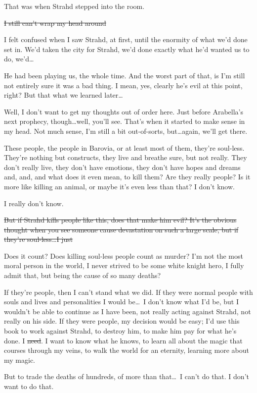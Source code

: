 That was when Strahd stepped into the room.

\st{I still can't wrap my head around}

I felt confused when I saw Strahd, at first, until the enormity of what we'd done set in. We'd taken the city for Strahd, we'd done exactly what he'd wanted us to do, we'd\dots

He had been playing us, the whole time. And the worst part of that, is I'm still not entirely sure it was a bad thing. I mean, yes, clearly he's evil at this point, right? But that what we learned later\dots

Well, I don't want to get my thoughts out of order here. Just before Arabella's next prophecy, though\dots well, you'll see. That's when it started to make sense in my head. Not much sense, I'm still a bit out-of-sorts, but\dots again, we'll get there.

These people, the people in Barovia, or at least most of them, they're soul-less. They're nothing but constructs, they live and breathe sure, but not really. They don't really live, they don't have emotions, they don't have hopes and dreams and, and, and what does it even mean, to kill them? Are they really people? Is it more like killing an animal, or maybe it's even less than that? I don't know.

I really don't know.

\st{But if Strahd kills people like this, does that make him evil? It's the obvious thought when you see someone cause devastation on such a large scale, but if they're soul-less\dots I just}

Does it count? Does killing soul-less people count as murder? I'm not the most moral person in the world, I never strived to be some white knight hero, I fully admit that, but being the cause of so many deaths?

If they're people, then I can't stand what we did. If they were normal people with souls and lives and personalities I would be\dots\ I don't know what I'd be, but I wouldn't be able to continue as I have been, not really acting against Strahd, not really on his side. If they were people, my decision would be easy; I'd use this book to work against Strahd, to destroy him, to make him pay for what he's done. I \st{need}. I want to know what he knows, to learn all about the magic that courses through my veins, to walk the world for an eternity, learning more about my magic.

But to trade the deaths of hundreds, of more than that\dots\ I can't do that. I don't want to do that.

